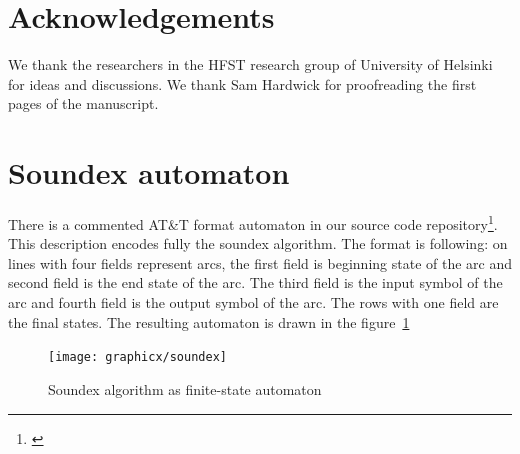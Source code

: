 \documentclass[a4paper,12pt]{article}
\begin{document}
\section*{Acknowledgements}

We thank the researchers in the HFST research group of University of Helsinki
for ideas and discussions. We thank Sam Hardwick for proofreading the first
pages of the manuscript.



\section*{Soundex automaton}
\label{appendix:soundex}

There is a commented AT\&T format automaton in our source code
repository\footnote{\url{}}. This description encodes fully the soundex
algorithm.  The format is following: on lines with four fields represent arcs,
the first field is beginning state of the arc and second field is the end state
of the arc. The third field is the input symbol of the arc and fourth field is
the output symbol of the arc. The rows with one field are the final states. The
resulting automaton is drawn in the figure~\ref{fig:soundex}

\begin{figure}
    \centering
    \texttt{[image: graphicx/soundex]}
    \caption{Soundex algorithm as finite-state automaton
    \label{fig:soundex}}
\end{figure}
\end{document}
